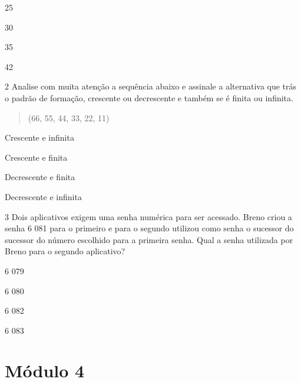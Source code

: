 \begin{escolha}
\item
  25
\item
  30
\item
  35
\item
  42
\end{escolha}


\num{2} Analise com muita atenção a sequência abaixo e assinale a
alternativa que trás o padrão de formação, crescente ou decrescente e
também se é finita ou infinita.

\begin{quote}
(66, 55, 44, 33, 22, 11)
\end{quote}

\begin{escolha}
\item
  Crescente e infinita
\item
  Crescente e finita
\item
  Decrescente e finita
\item
  Decrescente e infinita
\end{escolha}


\num{3} Dois aplicativos exigem uma senha numérica para ser acessado. Breno
criou a senha 6 081 para o primeiro e para o segundo utilizou como senha
o sucessor do sucessor do número escolhido para a primeira senha. Qual a
senha utilizada por Breno para o segundo aplicativo?

\begin{escolha}
\item
  6 079
\item
  6 080
\item
  6 082
\item
  6 083
\end{escolha}


\chapter{Módulo 4}



